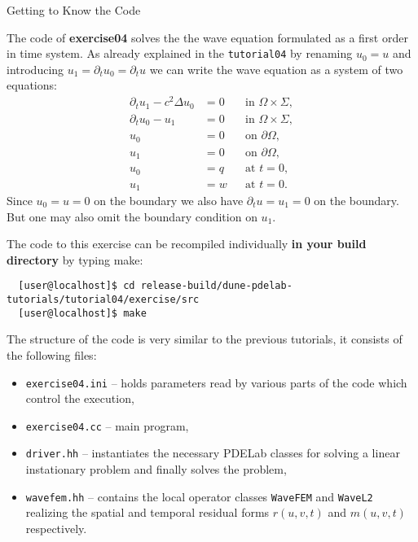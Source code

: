 \documentclass[12pt,a4paper]{article}
\begin{document}
\begin{Exercise}{Getting to Know the Code}

  \lstset{language=bash}

  The code of \textbf{exercise04} solves the the wave equation formulated as a first order in time system. As already explained in the \lstinline{tutorial04} by renaming $u_0=u$ and introducing $u_1=\partial_t u_0 =\partial_t u$ we can write the wave equation as a system of two equations:
\begin{subequations}
\label{eq:SystemForm1}
\begin{align}
\partial_t u_1 - c^2\Delta u_0 &=0 &&\text{in $\Omega\times\Sigma$}, \label{eq:2a}\\
\partial_t u_0 - u_1 &=0 &&\text{in $\Omega\times\Sigma$}, \label{eq:2b}\\
u_0 &= 0 &&\text{on $\partial\Omega$},\\
u_1 &= 0 &&\text{on $\partial\Omega$},\\
u_0 &= q &&\text{at $t=0$},\\
u_1 &= w &&\text{at $t=0$}.
\end{align}
\end{subequations}
Since $u_0=u=0$ on the boundary we also have $\partial_t u = u_1 = 0$ on the boundary.
But one may also omit the boundary condition on $u_1$.  
  

  The code to this exercise can be recompiled individually \textbf{in
    your build directory} by typing make:
  \begin{lstlisting}
  [user@localhost]$ cd release-build/dune-pdelab-tutorials/tutorial04/exercise/src
  [user@localhost]$ make
  \end{lstlisting}

  The structure of the code is very similar to the previous tutorials,
  it consists of the following files:
  \begin{itemize}
  \item \lstinline!exercise04.ini! -- holds parameters read by various parts of the code which control the execution,
  \item \lstinline!exercise04.cc! -- main program, 
  \item \lstinline!driver.hh! -- instantiates the necessary PDELab classes for solving a linear instationary problem and finally solves the problem,
  \item \lstinline!wavefem.hh! -- contains the local operator classes \lstinline!WaveFEM! and \lstinline!WaveL2! realizing the spatial and temporal residual forms $r(u,v,t)$ and $m(u,v,t)$ respectively.
  \end{itemize}
  

\end{Exercise}
\end{document}
